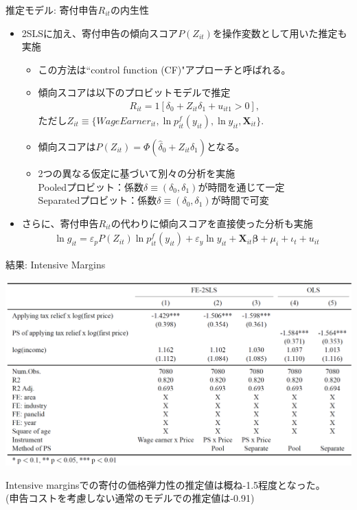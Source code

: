 \documentclass[dvipdfmx,10pt]{beamer}
\begin{document}
\begin{frame}{推定モデル: 寄付申告$R_{it}$の内生性}
	\begin{itemize}
		\item 2SLSに加え、寄付申告の傾向スコア$P(Z_{it})$を操作変数として用いた推定も実施
		\begin{itemize}
			\item この方法は``control function (CF)"アプローチと呼ばれる。
			\item 傾向スコアは以下のプロビットモデルで推定
			\begin{align}
				R_{it}=1[\delta_0+Z_{it}\delta_1+u_{it1}>0]\tag{8},
			\end{align}
			ただし$Z_{it}\equiv \{WageEarner_{it}, \ln p_{it}^f(y_{it}), \ln y_{it}, \bm{X}_{it}\}$.
			\item 傾向スコアは$P(Z_{it})=\Phi(\hat{\delta}_0+Z_{it}\hat{\delta}_1)$となる。
			\item 2つの異なる仮定に基づいて別々の分析を実施\\
			  Pooledプロビット：係数$\delta\equiv (\delta_0, \delta_1)$が時間を通じて一定\\
			  Separatedプロビット：係数$\delta\equiv (\delta_0, \delta_1)$が時間で可変
		\end{itemize}
		\item さらに、寄付申告$R_{it}$の代わりに傾向スコアを直接使った分析も実施
		\begin{align}
			\ln g_{it} = \varepsilon_pP(Z_{it})\ln p_{it}^f(y_{it}) + \varepsilon_y \ln y_{it} + \bm{X}_{it}\bm{\beta} + \mu_i + \iota_t + u_{it}\tag{9}
		\end{align}
	\end{itemize}
\end{frame}

\begin{frame}{結果: Intensive Margins}
	\begin{table}
		\centering
		\includegraphics[width=0.9\linewidth]{Tab_res_1}
		\caption{First-Price Elasticities (Intensive Margins)}
		\label{tab:2}
	\end{table}
Intensive marginsでの寄付の価格弾力性の推定値は概ね-1.5程度となった。\\
(申告コストを考慮しない通常のモデルでの推定値は-0.91)
\end{frame}
\end{document}
